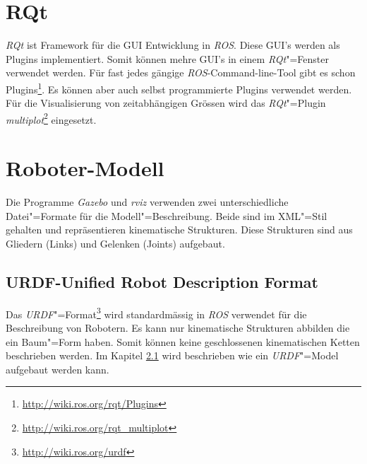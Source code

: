 


\section{RQt}
\label{chap:rqt}
\textit{RQt} ist Framework für die GUI Entwicklung in \textit{ROS}.
Diese GUI's werden als Plugins implementiert.
Somit können mehre GUI's in einem \textit{RQt}"=Fenster verwendet werden.
Für fast jedes gängige \textit{ROS}-Command-line-Tool gibt es schon Plugins\footnote{\url{http://wiki.ros.org/rqt/Plugins}}.
Es können aber auch selbst programmierte Plugins verwendet werden. 
Für die Visualisierung von zeitabhängigen Grössen wird das \textit{RQt}"=Plugin \textit{multiplot}\footnote{\url{http://wiki.ros.org/rqt_multiplot}} eingesetzt. %



\section{Roboter-Modell} %
\label{chap:roboter-modell}

Die Programme \textit{Gazebo} und \textit{rviz} verwenden zwei unterschiedliche Datei"=Formate für die Modell"=Beschreibung.
Beide sind im XML"=Stil gehalten und repräsentieren kinematische Strukturen.
Diese Strukturen sind aus Gliedern (Links) und Gelenken (Joints) aufgebaut.

\subsection{URDF-Unified Robot Description Format}
\label{chap:urdf}
Das \textit{URDF}"=Format\footnote{\url{http://wiki.ros.org/urdf}} wird standardmässig in \textit{ROS} verwendet für die Beschreibung von Robotern.
Es kann nur kinematische Strukturen abbilden die ein Baum"=Form haben.
Somit können keine geschlossenen kinematischen Ketten beschrieben werden.
Im Kapitel \ref{chap:urdf} wird beschrieben wie ein \textit{URDF}"=Model aufgebaut werden kann.

